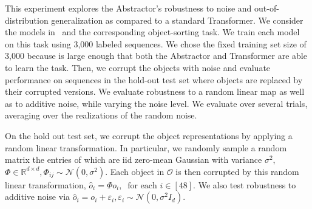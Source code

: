 
This experiment explores the Abstractor's robustness to noise and out-of-distribution generalization as compared to a standard Transformer. We consider the models in~ and the corresponding object-sorting task. We train each model on this task using 3,000 labeled sequences. We chose the fixed training set size of 3,000 because is large enough that both the Abstractor and Transformer are able to learn the task. Then, we corrupt the objects with noise and evaluate performance on sequences in the hold-out test set where objects are replaced by their corrupted versions. We evaluate robustness to a random linear map as well as to additive noise, while varying the noise level. We evaluate over several trials, averaging over the realizations of the random noise.

On the hold out test set, we corrupt the object representations by applying a random linear transformation. In particular, we randomly sample a random matrix the entries of which are iid zero-mean Gaussian with variance $\sigma^2$, $\Phi \in \mathbb{R}^{d \times d}, \Phi_{ij} \sim \mathcal{N}(0, \sigma^2)$. Each object in $\mathcal{O}$ is then corrupted by this random linear transformation, $\hat{o}_i = \Phi o_i, \ \text{ for each } i \in [48]$. We also test robustness to additive noise via $\hat{o}_i = o_i + \varepsilon_i, \varepsilon_i \sim \mathcal{N}(0, \sigma^2 I_d)$.

